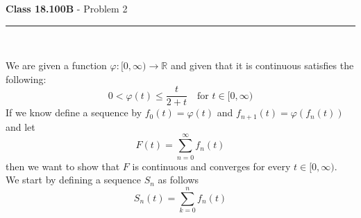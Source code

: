 \documentclass[11pt,reqno]{article}
\begin{document}
\vspace{15pt}
\begin{flushleft} 
\textbf{Class 18.100B} - Problem 2\\
\rule{500pt}{1pt}\\
\end{flushleft} 

We are given a function $\varphi : [0,\infty) \to \mathbb{R}$ and given that it is continuous satisfies the following:
\[ 0 < \varphi(t) \le \frac{t}{2+t} \quad \text{for $t \in [0,\infty)$} \]
If we know define a sequence by $f_0(t) = \varphi(t)$ and $f_{n+1}(t) = \varphi(f_n(t))$ and let 
\[ F(t) = \sum_{n=0}^\infty f_n(t) \]
then we want to show that $F$ is continuous and converges for every $t \in [0,\infty)$.\\

\noindent We start by defining a sequence $S_n$ as follows 
\begin{equation}
S_n(t) = \sum_{k = 0}^n f_n(t)
\end{equation}
\end{document}
